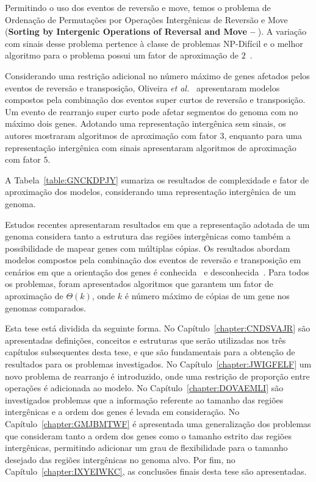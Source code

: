 Permitindo o uso dos eventos de reversão e move, temos o problema de Ordenação de Permutações por Operações Intergênicas de Reversão e Move (\textbf{Sorting by Intergenic Operations of Reversal and Move --} \SbIRM). A variação com sinais desse problema pertence à classe de problemas NP-Difícil e o melhor algoritmo para o problema possui um fator de aproximação de $2$~\cite{2022b-brito-etal}.

Considerando uma restrição adicional no número máximo de genes afetados pelos eventos de reversão e transposição, Oliveira \textit{et al.}~\cite{2019c-oliveira-etal} apresentaram modelos compostos pela combinação dos eventos super curtos de reversão e transposição. Um evento de rearranjo super curto pode afetar segmentos do genoma com no máximo dois genes. Adotando uma representação intergênica sem sinais, os autores mostraram algoritmos de aproximação com fator $3$, enquanto para uma representação intergênica com sinais apresentaram algoritmos de aproximação com fator $5$.

A Tabela~\ref{table:GNCKDPJY} sumariza os resultados de complexidade e fator de aproximação dos modelos, considerando uma representação intergênica de um genoma.



Estudos recentes apresentaram resultados em que a representação adotada de um genoma considera tanto a estrutura das regiões intergênicas como também a possibilidade de mapear genes com múltiplas cópias. Os resultados abordam modelos compostos pela combinação dos eventos de reversão e transposição em cenários em que a orientação dos genes é conhecida~\cite{2022-siqueira-etal} e desconhecida~\cite{2021b-siqueira-etal}. Para todos os problemas, foram apresentados algoritmos que garantem um fator de aproximação de $\Theta(k)$, onde $k$ é número máximo de cópias de um gene nos genomas comparados.

Esta tese está dividida da seguinte forma. No Capítulo~\ref{chapter:CNDSVAJR} são apresentadas definições, conceitos e estruturas que serão utilizadas nos três capítulos subsequentes desta tese, e que são fundamentais para a obtenção de resultados para os problemas investigados. No Capítulo~\ref{chapter:JWIGFELF} um novo problema de rearranjo é introduzido, onde uma restrição de proporção entre operações é adicionada ao modelo. No Capítulo~\ref{chapter:DOVAEMLI} são investigados problemas que a informação referente ao tamanho das regiões intergênicas e a ordem dos genes é levada em consideração. No Capítulo~\ref{chapter:GMJBMTWF} é apresentada uma generalização dos problemas que consideram tanto a ordem dos genes como o tamanho estrito das regiões intergênicas, permitindo adicionar um grau de flexibilidade para o tamanho desejado das regiões intergênicas no genoma alvo. Por fim, no Capítulo~\ref{chapter:IXYEIWKC}, as conclusões finais desta tese são apresentadas.

